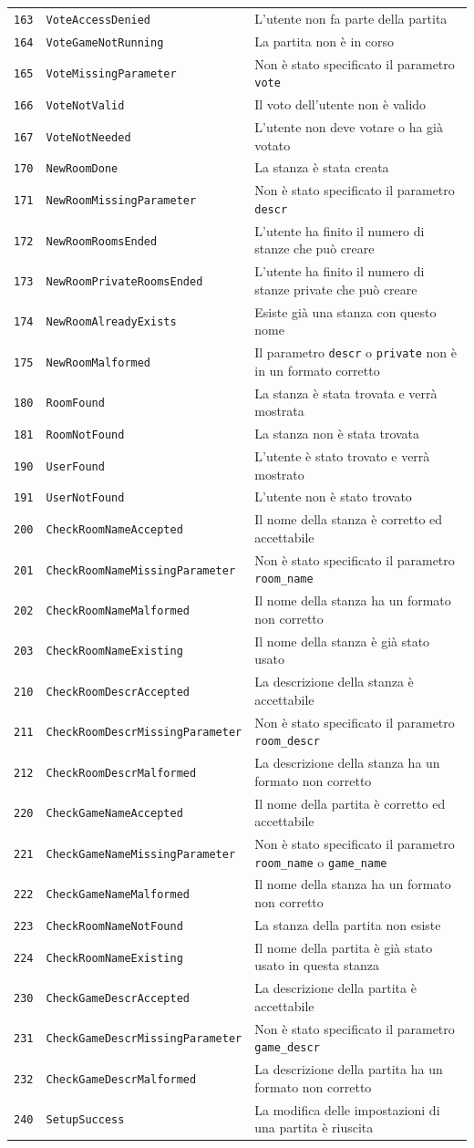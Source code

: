 \documentclass[10pt,a4paper]{article}
\newcommand{\apicode}[3]{
\texttt{#1} & \texttt{#2} & #3 \\
}
\begin{document}
{\begin{tabular}{|rl|l|}
\apicode{163}{VoteAccessDenied}{L'utente non fa parte della partita}
\apicode{164}{VoteGameNotRunning}{La partita non è in corso}
\apicode{165}{VoteMissingParameter}{Non è stato specificato il parametro \texttt{vote}}
\apicode{166}{VoteNotValid}{Il voto dell'utente non è valido}
\apicode{167}{VoteNotNeeded}{L'utente non deve votare o ha già votato}
\hline
\apicode{170}{NewRoomDone}{La stanza è stata creata}
\apicode{171}{NewRoomMissingParameter}{Non è stato specificato il parametro \texttt{descr}}
\apicode{172}{NewRoomRoomsEnded}{L'utente ha finito il numero di stanze che può creare}
\apicode{173}{NewRoomPrivateRoomsEnded}{L'utente ha finito il numero di stanze private che può creare}
\apicode{174}{NewRoomAlreadyExists}{Esiste già una stanza con questo nome}
\apicode{175}{NewRoomMalformed}{Il parametro \texttt{descr} o \texttt{private} non è in un formato corretto}
\hline
\apicode{180}{RoomFound}{La stanza è stata trovata e verrà mostrata}
\apicode{181}{RoomNotFound}{La stanza non è stata trovata}
\hline
\apicode{190}{UserFound}{L'utente è stato trovato e verrà mostrato}
\apicode{191}{UserNotFound}{L'utente non è stato trovato}
\hline
\apicode{200}{CheckRoomNameAccepted}{Il nome della stanza è corretto ed accettabile}
\apicode{201}{CheckRoomNameMissingParameter}{Non è stato specificato il parametro \texttt{room\_name}}
\apicode{202}{CheckRoomNameMalformed}{Il nome della stanza ha un formato non corretto}
\apicode{203}{CheckRoomNameExisting}{Il nome della stanza è già stato usato}
\hline
\apicode{210}{CheckRoomDescrAccepted}{La descrizione della stanza è accettabile}
\apicode{211}{CheckRoomDescrMissingParameter}{Non è stato specificato il parametro \texttt{room\_descr}}
\apicode{212}{CheckRoomDescrMalformed}{La descrizione della stanza ha un formato non corretto}
\hline
\apicode{220}{CheckGameNameAccepted}{Il nome della partita è corretto ed accettabile}
\apicode{221}{CheckGameNameMissingParameter}{Non è stato specificato il parametro \texttt{room\_name} o \texttt{game\_name}}
\apicode{222}{CheckGameNameMalformed}{Il nome della stanza ha un formato non corretto}
\apicode{223}{CheckRoomNameNotFound}{La stanza della partita non esiste}
\apicode{224}{CheckRoomNameExisting}{Il nome della partita è già stato usato in questa stanza}
\hline
\apicode{230}{CheckGameDescrAccepted}{La descrizione della partita è accettabile}
\apicode{231}{CheckGameDescrMissingParameter}{Non è stato specificato il parametro \texttt{game\_descr}}
\apicode{232}{CheckGameDescrMalformed}{La descrizione della partita ha un formato non corretto}
\hline
\apicode{240}{SetupSuccess}{La modifica delle impostazioni di una partita è riuscita}

\end{tabular}}
\end{document}
